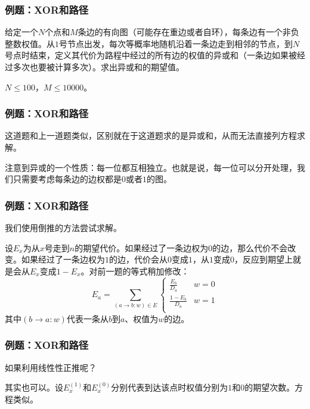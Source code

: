 \documentclass[9pt,dvipsnames]{beamer}
\begin{document}
\begin{frame}
	\frametitle{例题：XOR和路径}
	给定一个$N$个点和$M$条边的有向图（可能存在重边或者自环），每条边有一个非负整数权值。从$1$号节点出发，每次等概率地随机沿着一条边走到相邻的节点，到$N$号点时结束，定义其代价为路程中经过的所有边的权值的异或和（一条边如果被经过多次也要被计算多次）。求出异或和的期望值。

	$N\leq 100$，$M\leq 10000$。
\end{frame}
\begin{frame}
	\frametitle{例题：XOR和路径}
	这道题和上一道题类似，区别就在于这道题求的是异或和，从而无法直接列方程求解。\pause

	注意到异或的一个性质：每一位都互相独立。也就是说，每一位可以分开处理，我们只需要考虑每条边的边权都是$0$或者$1$的图。
\end{frame}
\begin{frame}
	\frametitle{例题：XOR和路径}
	我们使用倒推的方法尝试求解。

	设$E_x$为从$x$号走到$n$的期望代价。如果经过了一条边权为$0$的边，那么代价不会改变。如果经过了一条边权为$1$的边，代价会从$0$变成$1$，从$1$变成$0$，反应到期望上就是会从$E_x$变成$1-E_x$。对前一题的等式稍加修改：
	\[ E_a=\sum_{(a\rightarrow b:w)\in E} \left\{\begin{array}{ll}
		\frac{E_b}{D_a}		& w=0 \\
		\frac{1-E_b}{D_a}	& w=1 \\
	\end{array}\right. \]
	其中$(b\rightarrow a:w)$代表一条从$b$到$a$、权值为$w$的边。
\end{frame}
\begin{frame}
	\frametitle{例题：XOR和路径}
	如果利用线性性正推呢？\pause

	其实也可以。设$E_x^{(1)}$和$E_x^{(0)}$分别代表到达该点时权值分别为$1$和$0$的期望次数。方程类似。
\end{frame}
\end{document}
